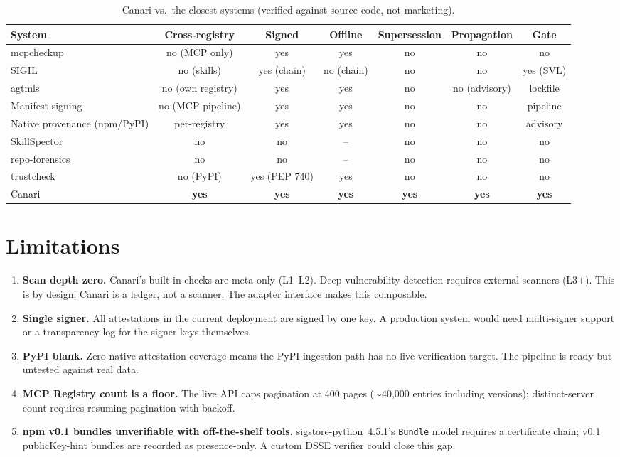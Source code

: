 \documentclass[11pt,a4paper]{article}
\begin{document}
\begin{table}[t]
\centering
\caption{Canari vs.\ the closest systems (verified against source code, not marketing).}
\label{tab:related}
\small
\begin{tabular}{lcccccc}
\toprule
System & Cross-registry & Signed & Offline & Supersession & Propagation & Gate \\
\midrule
mcpcheckup~\cite{mcpcheckup} & no (MCP only) & yes & yes & no & no & no \\
SIGIL~\cite{sigil} & no (skills) & yes (chain) & no (chain) & no & no & yes (SVL) \\
agtmls~\cite{agtmls} & no (own registry) & yes & yes & no & no (advisory) & lockfile \\
Manifest signing~\cite{manifest} & no (MCP pipeline) & yes & yes & no & no & pipeline \\
Native provenance (npm/PyPI) & per-registry & yes & yes & no & no & advisory \\
SkillSpector~\cite{skillspector} & no & no & -- & no & no & no \\
repo-forensics~\cite{repoforensics} & no & no & -- & no & no & no \\
trustcheck~\cite{trustcheck} & no (PyPI) & yes (PEP 740) & yes & no & no & no \\
\midrule
Canari & \textbf{yes} & \textbf{yes} & \textbf{yes} & \textbf{yes} & \textbf{yes} & \textbf{yes} \\
\bottomrule
\end{tabular}
\end{table}

\section{Limitations}

\begin{enumerate}[leftmargin=1.5em]
\item \textbf{Scan depth zero.} Canari's built-in checks are meta-only (L1--L2).
Deep vulnerability detection requires external scanners (L3+). This is by design:
Canari is a ledger, not a scanner. The adapter interface makes this composable.
\item \textbf{Single signer.} All attestations in the current deployment are
signed by one key. A production system would need multi-signer support or a
transparency log for the signer keys themselves.
\item \textbf{PyPI blank.} Zero native attestation coverage means the PyPI
ingestion path has no live verification target. The pipeline is ready but
untested against real data.
\item \textbf{MCP Registry count is a floor.} The live API caps pagination at
400 pages ($\sim$40{,}000 entries including versions); distinct-server count
requires resuming pagination with backoff.
\item \textbf{npm v0.1 bundles unverifiable with off-the-shelf tools.}
sigstore-python~4.5.1's \texttt{Bundle} model requires a certificate chain;
v0.1 publicKey-hint bundles are recorded as presence-only. A custom DSSE
verifier could close this gap.
\end{enumerate}
\end{document}
